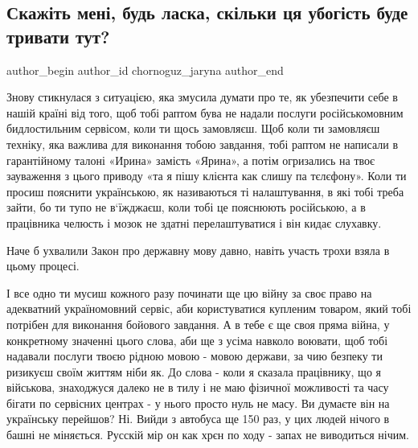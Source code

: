  
 
 
 
 
 
\subsection{Скажіть мені, будь ласка, скільки ця убогість буде тривати тут?}
\label{sec:30_10_2021.fb.chornoguz_jaryna.1.ubogist_mova_servis}
 
\ifcmt
 author_begin
   author_id chornoguz_jaryna
 author_end
\fi

Знову стикнулася з ситуацією, яка змусила думати про те, як убезпечити себе в
нашій країні від того, щоб тобі раптом бува не надали послуги російськомовним
бидлостильним сервісом, коли ти щось замовляєш. Щоб коли ти замовляєш техніку,
яка важлива для виконання тобою завдання, тобі раптом не написали в
гарантійному талоні «Ирина» замість «Ярина», а потім огризались на твоє
зауваження з цього приводу «та я пішу клієнта как слишу па тєлєфону». Коли ти
просиш пояснити українською, як називаються ті налаштування, в які тобі треба
зайти, бо ти тупо не в‘їжджаєш, коли тобі це пояснюють російською, а в
працівника челюсть і мозок не здатні перелаштуватися і він кидає слухавку.

Наче б ухвалили Закон про державну мову давно, навіть участь трохи взяла в
цьому процесі.

І все одно ти мусиш кожного разу починати ще цю війну за своє право на
адекватний україномовний сервіс, аби користуватися купленим товаром, який тобі
потрібен для виконання бойового завдання. А в тебе є ще своя пряма війна, у
конкретному значенні цього слова, аби ще з усіма навколо воювати, щоб тобі
надавали послуги твоєю рідною мовою - мовою держави, за чию безпеку ти ризикуєш
своїм життям ніби як. До слова - коли я сказала працівнику, що я військова,
знаходжуся далеко не в тилу  і не маю фізичної можливості та часу бігати по
сервісних центрах - у нього просто нуль не масу. Ви думаєте він на українську
перейшов? Ні. Вийди з автобуса ще 150 раз, у цих людей нічого в башні не
міняється. Русскій мір он как хрєн по ходу - запах не виводиться нічим.


